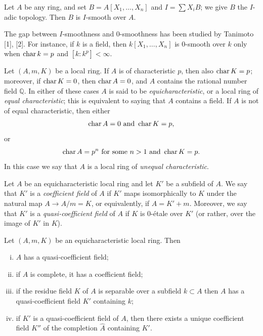\begin{example*}
Let $A$ be any ring, and set $B = A[X_1, \ldots, X_n]$ and $I = \sum X_iB$; we give $B$
the $I$-adic topology. Then $B$ is $I$-smooth over $A$.
\end{example*}

\begin{remark}
The gap between $I$-smoothness and 0-smoothness has been studied by Tanimoto
[1], [2]. For instance, if $k$ is a field, then $k[X_1, \ldots, X_n]$ is 0-smooth over
$k$ only when $\operatorname{char} k = p$ and $[k : k^p] < \infty$.
\end{remark}

Let $(A, m, K)$ be a local ring. If $A$ is of characteristic $p$, then also $\operatorname{char} K = p$;
moreover, if $\operatorname{char} K = 0$, then $\operatorname{char} A = 0$, and $A$ contains the rational number
field $\mathbb{Q}$. In either of these cases $A$ is said to be \emph{equicharacteristic}, or a
local ring of \emph{equal characteristic}; this is equivalent to saying that $A$ contains a
field. If $A$ is not of equal characteristic, then either
\[
  \operatorname{char} A = 0 \text{ and } \operatorname{char} K = p,
\]
or
\[
  \operatorname{char} A = p^n \text{ for some } n > 1 \text{ and } \operatorname{char} K = p.
\]
In this case we say that $A$ is a local ring of \emph{unequal characteristic}.

Let $A$ be an equicharacteristic local ring and let $K'$ be a subfield of $A$. We say
that $K'$ is a \emph{coefficient field} of $A$ if $K'$ maps isomorphically to $K$ under the
natural map $A \to A/m = K$, or equivalently, if $A = K' + m$. Moreover, we say that
$K'$ is a \emph{quasi-coefficient field} of $A$ if $K$ is 0-\'etale over $K'$ (or rather, over
the image of $K'$ in $K$).

\begin{theorem}\label{thm:28.3}
Let $(A, m, K)$ be an equicharacteristic local ring. Then
\begin{enumerate}[(i)]
  \item $A$ has a quasi-coefficient field;
  \item if $A$ is complete, it has a coefficient field;
  \item if the residue field $K$ of $A$ is separable over a subfield $k \subset A$ then
        $A$ has a quasi-coefficient field $K'$ containing $k$;
  \item if $K'$ is a quasi-coefficient field of $A$, then there exists a unique
        coefficient field $K''$ of the completion $\hat{A}$ containing $K'$.
\end{enumerate}
\end{theorem}

